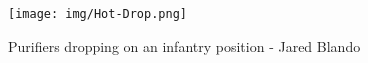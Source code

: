 \begin{figure}[!h]
  \centering
  \texttt{[image: img/Hot-Drop.png]}
  \caption*{Purifiers dropping on an infantry position - Jared Blando}
\end{figure}
